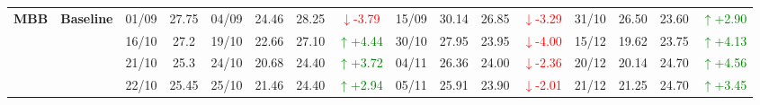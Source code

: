 \documentclass{ieeeaccess}
\begin{document}
{\begin{longtable}{llcc|cccc|cccc|cccc}
\multirow{4}{*}{\textbf{MBB}}
& \textbf{Baseline}
& 01/09 & 27.75 & 04/09 & 24.46 & 28.25 & \textcolor{red}{\(\downarrow\)-3.79} & 15/09 & 30.14 & 26.85 & \textcolor{red}{\(\downarrow\)-3.29} & 31/10 & 26.50 & 23.60 & \textcolor{green}{\(\uparrow\)+2.90} \\
& & 16/10 & 27.2 & 19/10 & 22.66 & 27.10 & \textcolor{green}{\(\uparrow\)+4.44} & 30/10 & 27.95 & 23.95 & \textcolor{red}{\(\downarrow\)-4.00} & 15/12 & 19.62 & 23.75 & \textcolor{green}{\(\uparrow\)+4.13} \\
& & 21/10 & 25.3 & 24/10 & 20.68 & 24.40 & \textcolor{green}{\(\uparrow\)+3.72} & 04/11 & 26.36 & 24.00 & \textcolor{red}{\(\downarrow\)-2.36} & 20/12 & 20.14 & 24.70 & \textcolor{green}{\(\uparrow\)+4.56} \\
& & 22/10 & 25.45 & 25/10 & 21.46 & 24.40 & \textcolor{green}{\(\uparrow\)+2.94} & 05/11 & 25.91 & 23.90 & \textcolor{red}{\(\downarrow\)-2.01} & 21/12 & 21.25 & 24.70 & \textcolor{green}{\(\uparrow\)+3.45} \\
\midrule

\end{longtable}
}

\clearpage
\onecolumn
\end{document}

